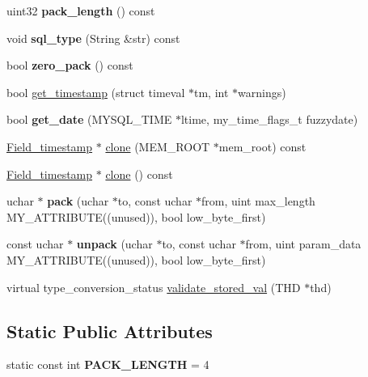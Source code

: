 \begin{DoxyCompactItemize}
uint32 {\bfseries pack\+\_\+length} () const
\item 
\mbox{\label{classField__timestamp_a4bbb6c4b604798f182f4d7bcba9d14a0}} 
void {\bfseries sql\+\_\+type} (String \&str) const
\item 
\mbox{\label{classField__timestamp_a796525a8011a7e7c9c2a44bb4a57f99b}} 
bool {\bfseries zero\+\_\+pack} () const
\item 
bool \mbox{\hyperlink{classField__timestamp_a462bff06ee84cafedf33b0a23d56a0f2}{get\+\_\+timestamp}} (struct timeval $\ast$tm, int $\ast$warnings)
\item 
\mbox{\label{classField__timestamp_a3f7ba57100591f1f19dab4d9e37e8c82}} 
bool {\bfseries get\+\_\+date} (M\+Y\+S\+Q\+L\+\_\+\+T\+I\+ME $\ast$ltime, my\+\_\+time\+\_\+flags\+\_\+t fuzzydate)
\item 
\mbox{\hyperlink{classField__timestamp}{Field\+\_\+timestamp}} $\ast$ \mbox{\hyperlink{classField__timestamp_ae6d4c965003c05cb96f827c4d5d97ce7}{clone}} (M\+E\+M\+\_\+\+R\+O\+OT $\ast$mem\+\_\+root) const
\item 
\mbox{\hyperlink{classField__timestamp}{Field\+\_\+timestamp}} $\ast$ \mbox{\hyperlink{classField__timestamp_ac47d953c0101691f25ed684c08738272}{clone}} () const
\item 
\mbox{\label{classField__timestamp_a0d7786586348556f95ebfdfb7a20fc67}} 
uchar $\ast$ {\bfseries pack} (uchar $\ast$to, const uchar $\ast$from, uint max\+\_\+length M\+Y\+\_\+\+A\+T\+T\+R\+I\+B\+U\+TE((unused)), bool low\+\_\+byte\+\_\+first)
\item 
\mbox{\label{classField__timestamp_a40d73ec0f6ce5b667e12d3c0f9dc62f6}} 
const uchar $\ast$ {\bfseries unpack} (uchar $\ast$to, const uchar $\ast$from, uint param\+\_\+data M\+Y\+\_\+\+A\+T\+T\+R\+I\+B\+U\+TE((unused)), bool low\+\_\+byte\+\_\+first)
\item 
virtual type\+\_\+conversion\+\_\+status \mbox{\hyperlink{classField__timestamp_ac6253aa19d757ba5607be97fbbefe02a}{validate\+\_\+stored\+\_\+val}} (T\+HD $\ast$thd)
\end{DoxyCompactItemize}
\subsection*{Static Public Attributes}
\begin{DoxyCompactItemize}
\item 
\mbox{\label{classField__timestamp_a461b2a78c3aa757d462559cc3bafa476}} 
static const int {\bfseries P\+A\+C\+K\+\_\+\+L\+E\+N\+G\+TH} = 4
\end{DoxyCompactItemize}

